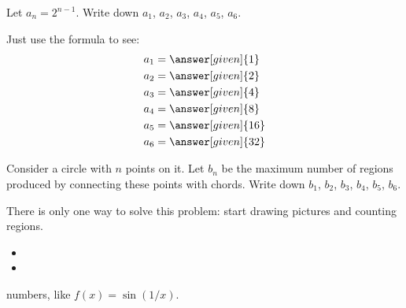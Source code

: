 \documentclass{ximera}
\begin{document}
\begin{example}
  Let $a_n = 2^{n-1}$.  Write down $a_1$, $a_2$, $a_3$, $a_4$, $a_5$,
  $a_6$.
  \begin{explanation}
    Just use the formula to see:
    \begin{align*}
      a_1 &= \answer[given]{1}\\
      a_2 &= \answer[given]{2}\\
      a_3 &= \answer[given]{4}\\
      a_4 &= \answer[given]{8}\\
      a_5 &= \answer[given]{16}\\
      a_6 &= \answer[given]{32}
    \end{align*}
  \end{explanation}
\end{example}


\begin{example}
  Consider a circle with $n$ points on it. Let $b_n$ be the maximum
  number of regions produced by connecting these points with
  chords. Write down $b_1$, $b_2$, $b_3$, $b_4$, $b_5$, $b_6$.
  \begin{explanation}
    There is only one way to solve this problem: start drawing
    pictures and counting regions.
    \begin{itemize}
      \item {}
      \item {}
    \end{itemize}
  \end{explanation}
\end{example}




numbers, like $f(x)=\sin (1/x)$.
\end{document}
